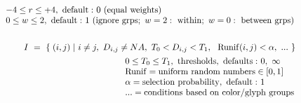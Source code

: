 \documentclass[11pt]{article}
\begin{document}
\begin{eqnarray*}
\\
&& ~~~~~~~~~~~~~~~
\begin{array}{l}
-4 \le r \le +4,  ~{\rm default:}~0 ~ ({\rm equal~weights})
\\
0 \le w \le 2, ~{\rm default:}~1 ~ ({\rm ignore~grps};~w=2:~{\rm within};~w=0:~{\rm between~grps})
\end{array}
\\
~
\\
&& I ~=~ \{ \; (i,j) \; |~ i \neq j ,~D_{i,j} \neq NA ,~T_0 < D_{i,j} < T_1 ,~~{\rm Runif}(i,j)<\alpha ,~ ...~ \}~
\\
&& ~~~~~~~~~~~~~~~
\begin{array}{l}
0 \le T_0 \le T_1, ~{\rm thresholds,~defaults:}~0,~\infty          \\
{\rm Runif} = {\rm uniform~random~numbers} \in [ 0,1 ] \\
\alpha = {\rm selection~probability,~ default:}~1      \\
... = {\rm conditions~based~on~color/glyph~groups}
\end{array}
\end{eqnarray*}
\end{document}
